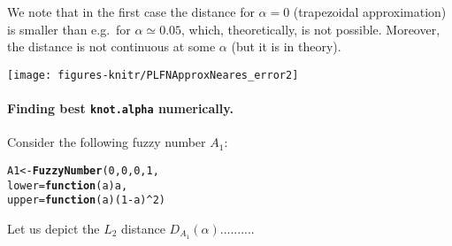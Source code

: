 \documentclass[11pt]{article}\usepackage{graphicx, color}
\makeatletter
\newcommand{\hlfunctioncall}[1]{\textcolor[rgb]{0.501960784313725,0,0.329411764705882}{\textbf{#1}}}%
\newenvironment{kframe}{%
 \def\at@end@of@kframe{}%
 \ifinner\ifhmode%
  \def\at@end@of@kframe{\end{minipage}}%
  \begin{minipage}{\columnwidth}%
 \fi\fi%
 \def\FrameCommand##1{\hskip\@totalleftmargin \hskip-\fboxsep
 \colorbox{shadecolor}{##1}\hskip-\fboxsep
     \hskip-\linewidth \hskip-\@totalleftmargin \hskip\columnwidth}%
 \MakeFramed {\advance\hsize-\width
   \@totalleftmargin\z@ \linewidth\hsize
   \@setminipage}}%
 {\par\unskip\endMakeFramed%
 \at@end@of@kframe}
\newenvironment{knitrout}{}{} %
\makeatother
\begin{document}
We note that in the first case the distance for $\alpha=0$ (trapezoidal
approximation) is
smaller than e.g.~for $\alpha\simeq 0.05$, which, theoretically,
is not possible. Moreover, the distance is not continuous
at some $\alpha$ (but it is in theory).

\begin{center}
\begin{knitrout}\small
{}\color{fgcolor}

{\centering \texttt{[image: figures-knitr/PLFNApproxNeares\_error2]} 

}



\end{knitrout}

\end{center}




\paragraph{Finding best \texttt{knot.alpha} numerically.}

Consider the following fuzzy number $A_1$:

\begin{knitrout}\small
{}\color{fgcolor}\begin{kframe}
\begin{alltt}
A1 <- \hlfunctioncall{FuzzyNumber}(0,0,0,1,
   lower=\hlfunctioncall{function}(a) a,
   upper=\hlfunctioncall{function}(a) (1-a)^2)
\end{alltt}
\end{kframe}
\end{knitrout}


Let us depict the $L_2$ distance $D_{A_1}(\alpha)$..........
\end{document}
